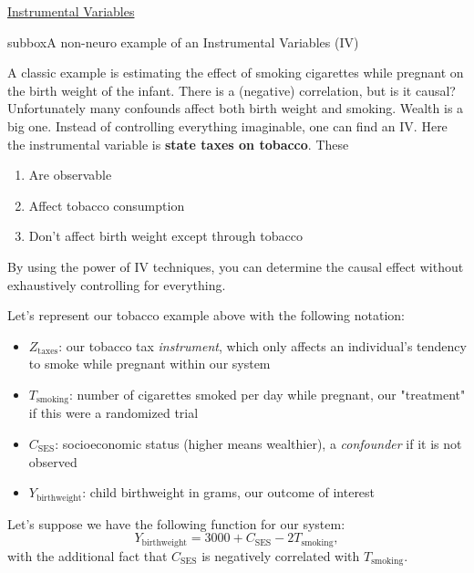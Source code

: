 \begin{textbox}{\href{https://compneuro.neuromatch.io/tutorials/W3D5_NetworkCausality/student/W3D5_Tutorial4.html}{Instrumental Variables }   }
\begin{subbox}{subbox}{A non-neuro example of an Instrumental Variables (IV)}
\scriptsize

A classic example is estimating the effect of smoking cigarettes while pregnant on the birth weight of the infant. There is a (negative) correlation, but is it causal? Unfortunately many confounds affect both birth weight and smoking. Wealth is a big one. Instead of controlling everything imaginable, one can find an IV. Here the instrumental variable is \textbf{state taxes on tobacco}. These

\begin{enumerate}
    \item    Are observable
    \item   Affect tobacco consumption
    \item   Don't affect birth weight except through tobacco
\end{enumerate}

By using the power of IV techniques, you can determine the causal effect without exhaustively controlling for everything.

Let's represent our tobacco example above with the following notation:
\begin{itemize}
    \item 
 $Z_{\text{taxes}}$: our tobacco tax \textit{instrument}, which only affects an individual's tendency to smoke while pregnant within our system
\item $T_{\text{smoking}}$: number of cigarettes smoked per day while pregnant, our "treatment" if this were a randomized trial
\item $C_{\text{SES}}$: socioeconomic status (higher means wealthier), a \textit{confounder} if it is not observed
\item
$Y_{\text{birthweight}}$: child birthweight in grams, our outcome of interest
\end{itemize}

Let's suppose we have the following function for our system:
$$Y_{\text{birthweight}} = 3000 + C_{\text{SES}} - 2T_{\text{smoking}},$$
with the additional fact that $C_{\text{SES}}$ is negatively correlated with $T_{\text{smoking}}$. 


\end{subbox}
\end{textbox}
